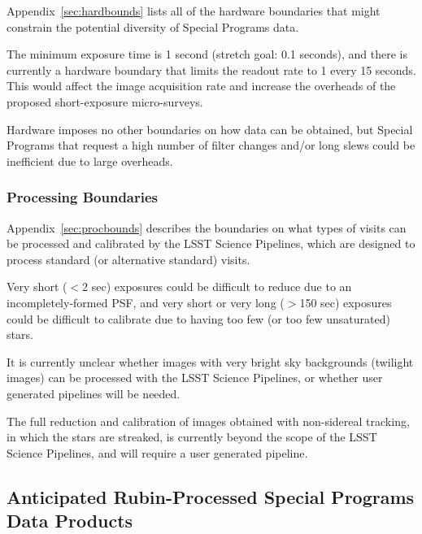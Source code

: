 \documentclass[DM,lsstdoc,toc]{lsstdoc}
\begin{document}
Appendix~\ref{sec:hardbounds} lists all of the hardware boundaries that might constrain the potential diversity of Special Programs data.

The minimum exposure time is 1 second (stretch goal: 0.1 seconds), and there is currently a hardware boundary that limits the readout rate to 1 every 15 seconds.
This would affect the image acquisition rate and increase the overheads of the proposed short-exposure micro-surveys.

Hardware imposes no other boundaries on how data can be obtained, but Special Programs that request a high number of filter changes and/or long slews could be inefficient due to large overheads.

\subsubsection{Processing Boundaries}

Appendix~\ref{sec:procbounds} describes the boundaries on what types of visits can be processed and calibrated by the LSST Science Pipelines, which are designed to process standard (or alternative standard) visits.

Very short ($<$2 sec) exposures could be difficult to reduce due to an incompletely-formed PSF, and very short or very long ($>$150 sec) exposures could be difficult to calibrate due to having too few (or too few unsaturated) stars.

It is currently unclear whether images with very bright sky backgrounds (twilight images) can be processed with the LSST Science Pipelines, or whether user generated pipelines will be needed.

The full reduction and calibration of images obtained with non-sidereal tracking, in which the stars are streaked, is currently beyond the scope of the LSST Science Pipelines, and will require a user generated pipeline.


\subsection{Anticipated Rubin-Processed Special Programs Data Products}
\end{document}
